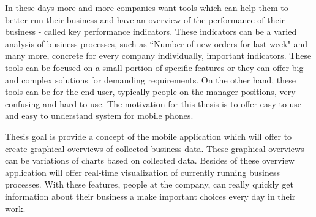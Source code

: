 In these days more and more companies want tools which can help them to better run their business and have an overview of the performance of their business - called key performance indicators. These indicators can be a varied analysis of business processes, such as ``Number of new orders for last week" and many more, concrete for every company individually, important indicators. These tools can be focused on a small portion of specific features or they can offer big and complex solutions for demanding requirements. On the other hand, these tools can be for the end user, typically people on the manager positions, very confusing and hard to use. The motivation for this thesis is to offer easy to use and easy to understand system for mobile phones.

Thesis goal is provide a concept of the mobile application which will offer to create graphical overviews of collected business data. These graphical overviews can be variations of charts based on collected data. Besides of these overview application will offer real-time visualization of currently running business processes. With these features, people at the company, can really quickly get information about their business a make important choices every day in their work. 